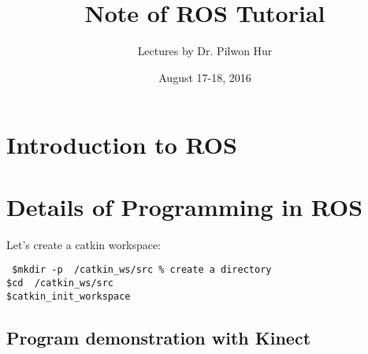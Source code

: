 \documentclass{article}
\title{Note of ROS Tutorial}
\author{Lectures by Dr. Pilwon Hur}
\date{August 17-18, 2016}
\begin{document}
\maketitle
\section{Introduction to ROS}








\section{Details of Programming in ROS}



Let's create a catkin workspace:
\begin{shaded}
\noindent\texttt{\noindent
	\$\quad mkdir -p ~/catkin\_ws/src \quad \% create a directory\\
	 \$\quad cd ~/catkin\_ws/src\\
	 \$\quad catkin\_init\_workspace}	 
\end{shaded}

\subsection{Program demonstration with Kinect}





%
\end{document}
